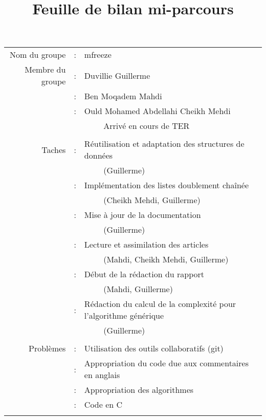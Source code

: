 

\title {Feuille de bilan mi-parcours}



\maketitle

\begin{tabular}{rcl}
	Nom du groupe     &:& mfreeze\\
	Membre du groupe  &:& Duvillie Guillerme \\
	                  &:& Ben Moqadem Mahdi \\ 
	                  &:& Ould Mohamed Abdellahi Cheikh Mehdi \\ 
										&& ~~~~ Arrivé en cours de TER \\
	\\
	Taches    &:& Réutilisation et adaptation des structures de données \\ && ~~~~ (Guillerme)\\
							 			&:&	Implémentation des listes doublement chaînée \\ && ~~~~ (Cheikh Mehdi, Guillerme)\\
	          &:& Mise à jour de la documentation \\ && ~~~~ (Guillerme) \\
	                  &:& Lecture et assimilation des articles  \\
														 && ~~~~ (Mahdi, Cheikh Mehdi, Guillerme)\\
	              &:& Début de la rédaction du rapport \\ && ~~~~ (Mahdi, Guillerme)\\
												 	 &:& Rédaction du calcul de la complexité pour l'algorithme générique \\
													 	&& ~~~~ (Guillerme)\\
	                  & &  \\
				 		Problèmes &:& Utilisation des outils collaboratifs (git) \\
									 		&:& Appropriation du code due aux commentaires en anglais \\
											&:& Appropriation des algorithmes \\
											&:& Code en C \\
											&& \\
\end{tabular}





